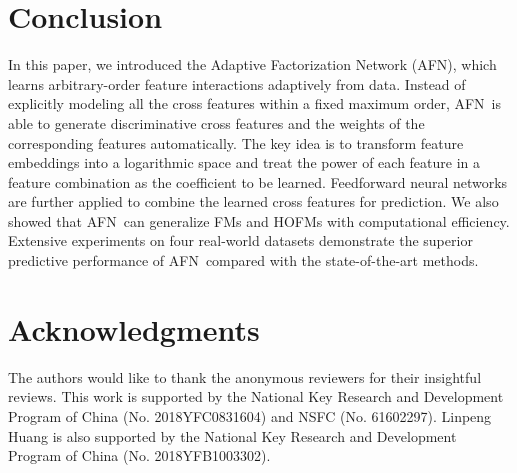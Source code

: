 \documentclass[letterpaper]{article} \usepackage{aaai20}  \usepackage{times}  \usepackage{helvet} \usepackage{courier}  \usepackage[hyphens]{url}  \usepackage{graphicx} \urlstyle{rm} \def\UrlFont{\rm}  \usepackage{graphicx}  \frenchspacing  \setlength{\pdfpagewidth}{8.5in}  \setlength{\pdfpageheight}{11in}
\newcommand{\model}{{AFN}~}
\newcommand{\modelns}{{AFN}}
\begin{document}
 
\section{Conclusion}

In this paper, we introduced the Adaptive Factorization Network (\modelns), which learns arbitrary-order feature interactions adaptively from data. Instead of explicitly modeling all the cross features within a fixed maximum order, \model is able to generate discriminative cross features and the weights of the corresponding features automatically.
The key idea is to transform feature embeddings into a logarithmic space and treat the power of each feature in a feature combination as the coefficient to be learned. 
Feedforward neural networks are further applied to combine the learned cross features for prediction. 
We also showed that \model can generalize FMs and HOFMs with computational efficiency. Extensive experiments on four real-world datasets demonstrate the superior predictive performance of \model compared with the state-of-the-art methods.

\section*{Acknowledgments}
The authors would like to thank the anonymous reviewers for their
insightful reviews.
This work is supported by the National Key Research
and Development Program of China (No. 2018YFC0831604) and NSFC (No. 61602297). Linpeng Huang is also supported by the National Key Research
and Development Program of China (No. 2018YFB1003302).


 
\end{document}
